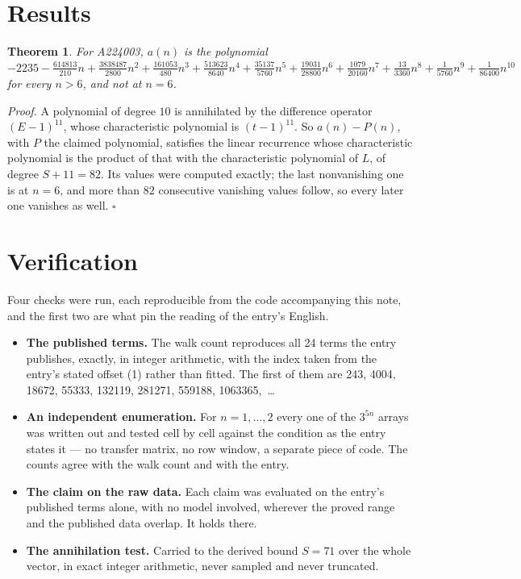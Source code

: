 \documentclass[11pt]{article}
\newtheorem{theorem}{Theorem}
\theoremstyle{definition}
\begin{document}
\section{Results}

\begin{theorem} For A224003, $a(n)$ is the polynomial $-2235 - \frac{614813}{210}n + \frac{3838487}{2800}n^{2} + \frac{161053}{480}n^{3} + \frac{513623}{8640}n^{4} + \frac{35137}{5760}n^{5} + \frac{19031}{28800}n^{6} + \frac{1079}{20160}n^{7} + \frac{13}{3360}n^{8} + \frac{1}{5760}n^{9} + \frac{1}{86400}n^{10}$ for every $n > 6$, and not at $n = 6$.\end{theorem}

{\itshape Proof.} A polynomial of degree $10$ is annihilated by the difference operator $(E-1)^{11}$, whose characteristic polynomial is $(t-1)^{11}$. So $a(n) - P(n)$, with $P$ the claimed polynomial, satisfies the linear recurrence whose characteristic polynomial is the product of that with the characteristic polynomial of $L$, of degree $S + 11 = 82$. Its values were computed exactly; the last nonvanishing one is at $n = 6$, and more than $82$ consecutive vanishing values follow, so every later one vanishes as well. $\square$

\section{Verification}

Four checks were run, each reproducible from the code accompanying this note, and the first two are what pin the reading of the entry's English.

\begin{itemize}

\item {\bfseries The published terms.} The walk count reproduces all 24 terms the entry publishes, exactly, in integer arithmetic, with the index taken from the entry's stated offset (1) rather than fitted. The first of them are 243, 4004, 18672, 55333, 132119, 281271, 559188, 1063365,~\dots

\item {\bfseries An independent enumeration.} For $n = 1,\dots,2$ every one of the $3^{5n}$ arrays was written out and tested cell by cell against the condition as the entry states it --- no transfer matrix, no row window, a separate piece of code. The counts agree with the walk count and with the entry.

\item {\bfseries The claim on the raw data.} Each claim was evaluated on the entry's published terms alone, with no model involved, wherever the proved range and the published data overlap. It holds there.

\item {\bfseries The annihilation test.} Carried to the derived bound $S = 71$ over the whole vector, in exact integer arithmetic, never sampled and never truncated.

\end{itemize}
\end{document}
